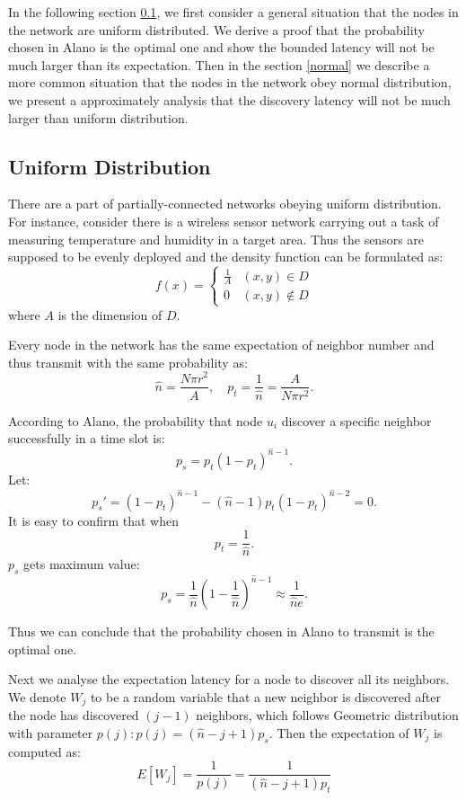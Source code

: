 In the following section \ref{uniform}, we first consider a general situation that the nodes
in the network are uniform distributed. We derive a proof that the probability
chosen in Alano is the optimal one and show the bounded latency will not 
be much larger than its expectation. Then in the section  \ref{normal} we describe a more
common situation that the nodes in the network obey normal distribution, we present a 
approximately analysis that the discovery latency will not be much larger than uniform distribution.


\subsection{Uniform Distribution}
\label{uniform}
There are a part of partially-connected networks obeying uniform distribution. 
For instance, consider there is a  wireless sensor network carrying out a task of
measuring temperature and humidity in a target area. 
Thus the sensors are supposed to be evenly deployed and the density function can be 
formulated as:
$$f(x)=
\begin{cases}
\frac{1}{A}& (x,y)\in D\\
0& (x,y)\notin D
\end{cases}$$
where $A$ is the dimension of $D$.

Every node in the network has the same expectation 
of neighbor number and thus transmit with the same probability as:
$$
\hat{n} = \frac{N\pi r^2}{A}, \quad p_t = \frac{1}{\hat{n}}=\frac{A}{N\pi r^2}.
$$  

According to Alano, the probability that node $u_i$ discover a specific
neighbor successfully in a time slot is:
$$
p_s = p_t{(1-p_t)}^{\hat{n}-1}.
$$
Let:
$$
p_s' = {(1-p_t)}^{\hat{n}-1}-(\hat{n}-1)p_t{(1-p_t)}^{\hat{n}-2}=0.
$$
It is easy to confirm that  when
$$p_t=\frac{1}{\hat{n}}.$$ 
$p_s$ gets maximum value:
$$p_s = \frac{1}{\hat{n}}{(1-\frac{1}{\hat{n}})}^{\hat{n}-1} \approx \frac{1}{\hat{n}e}.$$

Thus we can conclude that the probability chosen in Alano
to transmit is the optimal one. 

Next we analyse the expectation latency for a node to discover all its 
neighbors. We denote $W_j$ to be a random variable that a new neighbor
is discovered after the node has discovered $(j-1)$ neighbors, which follows 
Geometric distribution with parameter $p(j): p(j)=(\hat{n}-j+1)p_s$. Then the expectation
of $W_j$ is computed as:
$$
E[W_j]=\frac{1}{p(j)}=\frac{1}{(\hat{n}-j+1)p_t}
$$

